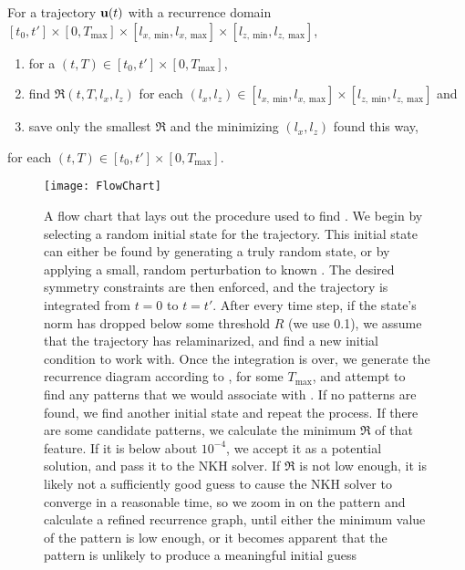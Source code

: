 \begin{algorithm}\label{alg:recBroke}
For a trajectory $\mathbf{u}(t)$ with a recurrence domain   $[t_0,t']\times [0,T_{\textrm{max}}] \times [l_{x,~\textrm{min}},l_{x,~\textrm{max}}] \times [l_{z,~\textrm{min}},l_{z,~\textrm{max}}]$, 
\begin{enumerate}
\item for a $(t,T) \in [t_0,t']\times [0,T_{\textrm{max}}]$, 
\item find $\mathfrak{R}(t,T,l_x,l_z)$ for each $(l_x,l_z) \in  [l_{x,~\textrm{min}},l_{x,~\textrm{max}}] \times [l_{z,~\textrm{min}},l_{z,~\textrm{max}}]$ and 
\item save only the smallest $\mathfrak{R}$ and the minimizing $(l_x,l_z)$ found this way,   
\end{enumerate}
 for each $(t,T) \in [t_0,t']\times [0,T_{\textrm{max}}]$.
\end{algorithm}

\begin{figure}[h!]
\texttt{[image: FlowChart]}
\caption[A flow chart that lays out the procedure used to find \ecs.]{A flow chart that lays out the procedure used to find \ecs. We begin by selecting a random initial state for the trajectory. This initial state can either be found by generating a truly random state, or by applying a small, random perturbation to known \ecs. The desired symmetry constraints are then enforced, and the trajectory is integrated from $t = 0$ to $t=t'$. After every time step, if the state's norm has dropped below some threshold $R$ (we use 0.1), we assume that the trajectory has relaminarized, and find a new initial condition to work with. Once the integration is over, we generate the recurrence diagram according to , for some $T_{\textrm{max}}$, and attempt to find any patterns that we would associate with \ecs. If no patterns are found, we find another initial state and repeat the process. If there are some candidate patterns, we calculate the minimum $\mathfrak{R}$ of that feature. If it is below about $10^{-4}$, we accept it as a potential solution, and pass it to the NKH solver. If $\mathfrak{R}$ is not low enough, it is likely not a sufficiently good guess to cause the NKH solver to converge in a reasonable time, so we zoom in on the pattern and calculate a refined recurrence graph, until either the minimum value of the pattern is low enough, or it becomes apparent that the pattern is unlikely to produce a meaningful initial guess}\label{fig:FlowChart} 
\end{figure}
 \clearpage
